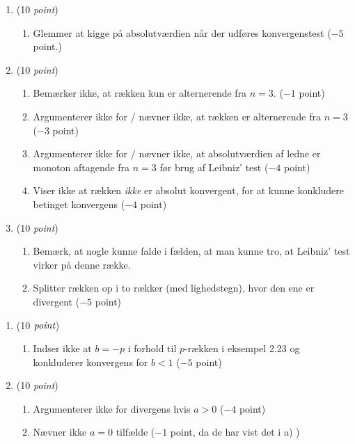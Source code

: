 \documentclass{article}
\begin{document}
\begin{opg}\hfill
	\begin{enumerate}
		\item (10 \emph{point})\begin{enumerate}[label=(\roman*)]
			\item Glemmer at kigge på absolutværdien når der udføres konvergenstest ($ -5 $ point.)
		\end{enumerate}
		\item (10 \emph{point}) \begin{enumerate}[label=(\roman*)]
			\item Bemærker ikke, at rækken kun er alternerende fra $ n=3 $. ($ -1 $ point)
			\item Argumenterer ikke for / nævner ikke, at rækken er alternerende fra $ n=3 $ ($ -3 $ point)
			\item Argumenterer ikke for / nævner ikke, at absolutværdien af ledne er monoton aftagende fra $ n=3 $ før brug af Leibniz' test ($ -4 $ point)
			\item Viser ikke at rækken \emph{ikke} er absolut konvergent, for at kunne konkludere betinget konvergens ($ -4 $ point)
		\end{enumerate}
		\item (10 \emph{point})\begin{enumerate}[label=(\roman*)]
			\item Bemærk, at nogle kunne falde i fælden, at man kunne tro, at Leibniz' test virker på denne række.
			\item Splitter rækken op i to rækker (med lighedstegn), hvor den ene er divergent ($ -5 $ point)
		\end{enumerate}
	\end{enumerate}	
\end{opg}
\begin{opg}\hfill
	\begin{enumerate}
		\item (10 $ \emph{point} $)
		\begin{enumerate}[label=(\roman*)]
			\item Indser ikke at $ b=-p $ i forhold til $ p $-rækken i eksempel 2.23 og konkluderer konvergens for $ b<1 $ ($ -5 $ point)
		\end{enumerate}
		\item (10 \emph{point}) 
		\begin{enumerate}[label=(\roman*)]
			\item Argumenterer ikke for divergens hvis $ a>0 $ ($ -4 $ point)
			\item Nævner ikke $ a=0 $ tilfælde ($ -1 $ point, da de har vist det i a) )
		\end{enumerate}

	\end{enumerate}
\end{opg}
\end{document}
